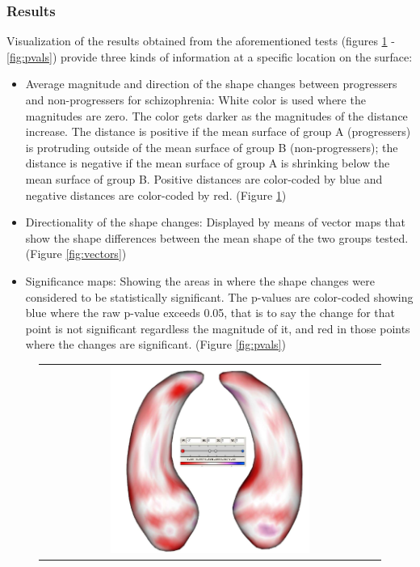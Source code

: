 \documentclass{InsightArticle}
\begin{document}
\subsubsection{Results}
\label{sec:lilresults2}

Visualization of the results obtained from the aforementioned tests (figures  \ref{fig:diff} - \ref{fig:pvals}) provide three kinds of information at a specific location on the surface:
	
\begin{itemize}
	\item Average magnitude and direction of the shape changes between progressers and non-progressers for schizophrenia: White color is used where the magnitudes are zero. The color gets darker as the magnitudes of the distance increase. The distance is positive if the mean surface of group A (progressers) is protruding outside of the mean surface of group B (non-progressers); the distance is negative if the mean surface of group A is shrinking below the mean surface of group B. Positive distances are color-coded by blue and negative distances are color-coded by red. (Figure \ref{fig:diff})
	\item Directionality of the shape changes: Displayed by means of vector maps that show the shape differences between the mean shape of the two groups tested. (Figure \ref{fig:vectors})
	\item Significance maps: Showing the areas in where the shape changes were considered to be statistically significant. The p-values are color-coded showing blue where the raw p-value exceeds 0.05, that is to say the change for that point is not significant regardless the magnitude of it, and red in those points where the changes are significant. (Figure \ref{fig:pvals})
\end{itemize}

\begin{figure}[htbp]
  \begin{center}
    \begin{tabular}[htbp]{c}
    \includegraphics[width=0.6\textwidth]{IJ_AnalysisScenario2_MeanDiff}
    \end{tabular}
    \label{fig:diff}
  \end{center}
\end{figure}
\end{document}
